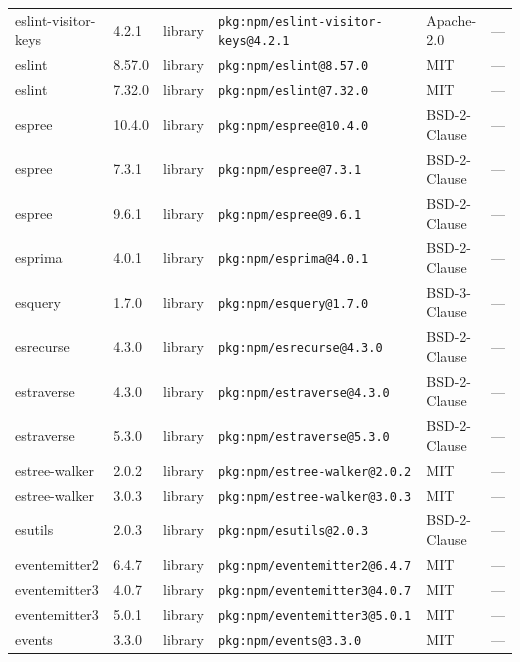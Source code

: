 \documentclass[11pt,a4paper]{article}
\begin{document}
\begin{longtable}{|p{4cm}|p{2cm}|p{1.6cm}|p{5cm}|p{1.5cm}|p{3.5cm}|}
\raggedright eslint-visitor-keys & 4.2.1 & library & \small\texttt{pkg:npm/eslint-visitor-keys@4.2.1} & Apache-2.0 & \small — \\
\raggedright eslint & 8.57.0 & library & \small\texttt{pkg:npm/eslint@8.57.0} & MIT & \small — \\
\raggedright eslint & 7.32.0 & library & \small\texttt{pkg:npm/eslint@7.32.0} & MIT & \small — \\
\raggedright espree & 10.4.0 & library & \small\texttt{pkg:npm/espree@10.4.0} & BSD-2-Clause & \small — \\
\raggedright espree & 7.3.1 & library & \small\texttt{pkg:npm/espree@7.3.1} & BSD-2-Clause & \small — \\
\raggedright espree & 9.6.1 & library & \small\texttt{pkg:npm/espree@9.6.1} & BSD-2-Clause & \small — \\
\raggedright esprima & 4.0.1 & library & \small\texttt{pkg:npm/esprima@4.0.1} & BSD-2-Clause & \small — \\
\raggedright esquery & 1.7.0 & library & \small\texttt{pkg:npm/esquery@1.7.0} & BSD-3-Clause & \small — \\
\raggedright esrecurse & 4.3.0 & library & \small\texttt{pkg:npm/esrecurse@4.3.0} & BSD-2-Clause & \small — \\
\raggedright estraverse & 4.3.0 & library & \small\texttt{pkg:npm/estraverse@4.3.0} & BSD-2-Clause & \small — \\
\raggedright estraverse & 5.3.0 & library & \small\texttt{pkg:npm/estraverse@5.3.0} & BSD-2-Clause & \small — \\
\raggedright estree-walker & 2.0.2 & library & \small\texttt{pkg:npm/estree-walker@2.0.2} & MIT & \small — \\
\raggedright estree-walker & 3.0.3 & library & \small\texttt{pkg:npm/estree-walker@3.0.3} & MIT & \small — \\
\raggedright esutils & 2.0.3 & library & \small\texttt{pkg:npm/esutils@2.0.3} & BSD-2-Clause & \small — \\
\raggedright eventemitter2 & 6.4.7 & library & \small\texttt{pkg:npm/eventemitter2@6.4.7} & MIT & \small — \\
\raggedright eventemitter3 & 4.0.7 & library & \small\texttt{pkg:npm/eventemitter3@4.0.7} & MIT & \small — \\
\raggedright eventemitter3 & 5.0.1 & library & \small\texttt{pkg:npm/eventemitter3@5.0.1} & MIT & \small — \\
\raggedright events & 3.3.0 & library & \small\texttt{pkg:npm/events@3.3.0} & MIT & \small — \\

\end{longtable}
\end{document}
